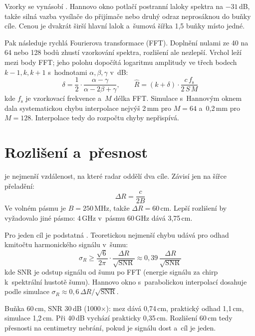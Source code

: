 \documentclass[czech]{skyren}
\begin{document}
Vzorky se vynásobí . Hannovo okno potlačí postranní laloky
spektra na $-31$\,dB, takže silná vazba vysílače do přijímače nebo druhý
odraz neprosáknou do buňky cíle. Cenou je dvakrát širší hlavní lalok
a~šumová šířka 1,5 buňky místo jedné.

Pak následuje rychlá Fourierova transformace (FFT). Doplnění nulami ze 40 na
64 nebo 128 bodů zhustí vzorkování spektra, rozlišení ale nezlepší.
Vrchol leží mezi body FFT; jeho polohu dopočítá
 logaritmu amplitudy ve třech bodech
$k-1, k, k+1$ s~hodnotami $\alpha, \beta, \gamma$ v~dB:
\[
\delta = \frac{1}{2}\cdot\frac{\alpha-\gamma}{\alpha-2\beta+\gamma}, \qquad
\hat R = (k+\delta)\cdot\frac{c\,f_\mathrm{s}}{2\,S\,M}
\]
kde $f_\mathrm{s}$ je vzorkovací frekvence a~$M$ délka FFT. Simulace
s~Hannovým oknem dala systematickou chybu interpolace nejvýš 2\,mm pro
$M = 64$ a~0,2\,mm pro $M = 128$. Interpolace tedy do rozpočtu chyby
nepřispívá.

\section{Rozlišení a~přesnost}

 je nejmenší vzdálenost, na které radar oddělí dva
cíle. Závisí jen na šířce přeladění:
\[
\Delta R = \frac{c}{2B}
\]
Ve volném pásmu  je $B = 250$\,MHz, takže
$\Delta R = 60$\,cm. Lepší rozlišení by vyžadovalo jiné pásmo: 4\,GHz
v~pásmu 60\,GHz dává 3,75\,cm.

Pro jeden cíl je podstatná . Teoretickou nejmenší
chybu udává  pro odhad kmitočtu harmonického
signálu v~šumu:
\[
\sigma_R \geq \frac{\sqrt{6}}{2\pi}\cdot\frac{\Delta R}{\sqrt{\mathrm{SNR}}}
\approx 0{,}39\,\frac{\Delta R}{\sqrt{\mathrm{SNR}}}
\]
kde SNR je odstup signálu od šumu po FFT (energie signálu za chirp
k~spektrální hustotě šumu). Hannovo okno s~parabolickou interpolací dosahuje
podle simulace $\sigma_R \approx 0{,}6\,\Delta R/\sqrt{\mathrm{SNR}}$.

\begin{skyrenexample}
Buňka 60\,cm, SNR 30\,dB (1000$\times$): mez dává 0,74\,cm, praktický
odhad 1,1\,cm, simulace 1,2\,cm. Při 40\,dB vychází prakticky 0,35\,cm.
Rozlišení 60\,cm tedy přesnosti na centimetry nebrání, pokud je signálu
dost a~cíl je jeden.
\end{skyrenexample}
\end{document}
